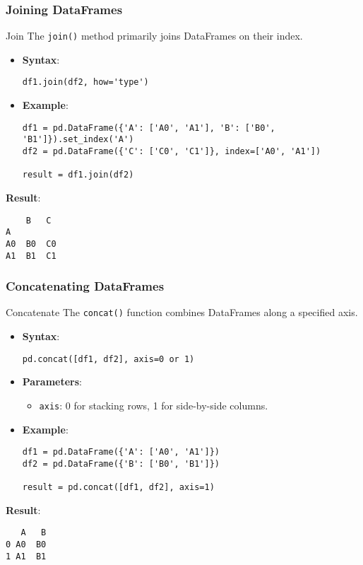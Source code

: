 \documentclass[aspectratio=169]{beamer}
\begin{document}
\begin{frame}[fragile]
    \frametitle{Joining DataFrames}
    \begin{block}{Join}
        The \texttt{join()} method primarily joins DataFrames on their index.
        \begin{itemize}
            \item \textbf{Syntax}:
            \begin{lstlisting}
df1.join(df2, how='type')
            \end{lstlisting}
            \item \textbf{Example}:
            \begin{lstlisting}
df1 = pd.DataFrame({'A': ['A0', 'A1'], 'B': ['B0', 'B1']}).set_index('A')
df2 = pd.DataFrame({'C': ['C0', 'C1']}, index=['A0', 'A1'])

result = df1.join(df2)
            \end{lstlisting}
        \end{itemize}
        \textbf{Result}:
        \begin{lstlisting}
    B   C
A       
A0  B0  C0
A1  B1  C1
        \end{lstlisting}
    \end{block}
\end{frame}

\begin{frame}[fragile]
    \frametitle{Concatenating DataFrames}
    \begin{block}{Concatenate}
        The \texttt{concat()} function combines DataFrames along a specified axis.
        \begin{itemize}
            \item \textbf{Syntax}:
            \begin{lstlisting}
pd.concat([df1, df2], axis=0 or 1)
            \end{lstlisting}
            \item \textbf{Parameters}:
            \begin{itemize}
                \item \texttt{axis}: 0 for stacking rows, 1 for side-by-side columns.
            \end{itemize}
            \item \textbf{Example}:
            \begin{lstlisting}
df1 = pd.DataFrame({'A': ['A0', 'A1']})
df2 = pd.DataFrame({'B': ['B0', 'B1']})

result = pd.concat([df1, df2], axis=1)
            \end{lstlisting}
        \end{itemize}
        \textbf{Result}:
        \begin{lstlisting}
   A   B
0 A0  B0
1 A1  B1
        \end{lstlisting}
    \end{block}
\end{frame}
\end{document}
